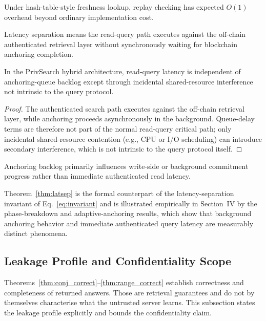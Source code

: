 \begin{corollary}
Under hash-table-style freshness lookup, replay checking has expected $O(1)$ overhead beyond ordinary implementation cost.
\end{corollary}

\begin{definition}
Latency separation means the read-query path executes against the off-chain authenticated retrieval layer without synchronously waiting for blockchain anchoring completion.
\end{definition}

\begin{theorem}
\label{thm:latsep}
In the PrivSearch hybrid architecture, read-query latency is independent of anchoring-queue backlog except through incidental shared-resource interference not intrinsic to the query protocol.
\end{theorem}
\begin{proof}
The authenticated search path executes against the off-chain retrieval layer, while anchoring proceeds asynchronously in the background. Queue-delay terms are therefore not part of the normal read-query critical path; only incidental shared-resource contention (e.g., CPU or I/O scheduling) can introduce secondary interference, which is not intrinsic to the query protocol itself.
\end{proof}

\begin{corollary}
Anchoring backlog primarily influences write-side or background commitment progress rather than immediate authenticated read latency.
\end{corollary}

Theorem~\ref{thm:latsep} is the formal counterpart of the latency-separation invariant of Eq.~\eqref{eq:invariant} and is illustrated empirically in Section~IV by the phase-breakdown and adaptive-anchoring results, which show that background anchoring behavior and immediate authenticated query latency are measurably distinct phenomena.

\subsection{Leakage Profile and Confidentiality Scope}
\label{subsec:leakage}

Theorems~\ref{thm:conj_correct}--\ref{thm:range_correct} establish correctness and completeness of returned answers. Those are retrieval guarantees and do not by themselves characterise what the untrusted server learns. This subsection states the leakage profile explicitly and bounds the confidentiality claim.

